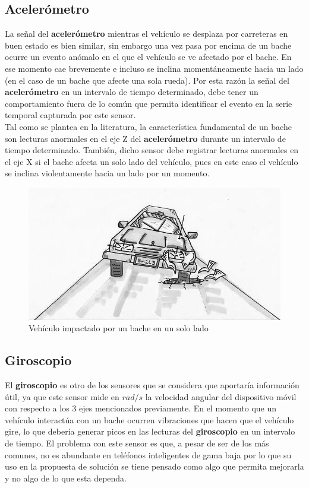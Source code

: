 	\subsection{Acelerómetro}
		La señal del \textbf{acelerómetro} mientras el vehículo se desplaza por carreteras en buen estado es bien similar,
		sin embargo una vez pasa por encima de un bache ocurre un evento anómalo en el que el vehículo se ve afectado
		por el bache. En ese momento cae brevemente e incluso se inclina momentáneamente hacia un lado (en el caso de un bache
		que afecte una sola rueda). Por esta razón la señal del \textbf{acelerómetro} en un intervalo de tiempo determinado, debe tener
		un comportamiento fuera de lo común que permita identificar el evento en la serie temporal capturada por este sensor.\\
		\indent Tal como se plantea en la literatura, la característica fundamental de un bache son lecturas anormales en el eje
		Z del \textbf{acelerómetro} durante un intervalo de tiempo determinado. También, dicho sensor debe registrar lecturas
		anormales en el eje X si el bache afecta un solo lado del vehículo, pues en este caso el vehículo se inclina violentamente
		hacia un lado por un momento.\\

	\begin{figure}[htb]
		\centering
		\includegraphics[scale = 0.5]{Graphics/one_side_pothole_vehicle.jpg}
		\caption{Vehículo impactado por un bache en un solo lado}
		\label{fig:4}
	\end{figure}

	\subsection{Giroscopio}
		El \textbf{giroscopio} es otro de los sensores que se considera que aportaría información útil, ya que este sensor 
		mide en $rad/s$ la velocidad angular del dispositivo móvil con respecto a los 3 ejes mencionados previamente. 
		En el momento que un vehículo interactúa con un bache ocurren vibraciones que hacen que el vehículo gire, lo que
		debería generar picos en las lecturas del \textbf{giroscopio} en un intervalo de tiempo. El problema con este sensor es 
		que, a pesar de ser de los más comunes, no es abundante en teléfonos inteligentes de gama baja por lo que 
		su uso en la propuesta de solución se tiene pensado como algo que permita mejorarla y no algo de lo que esta
		dependa.\\

